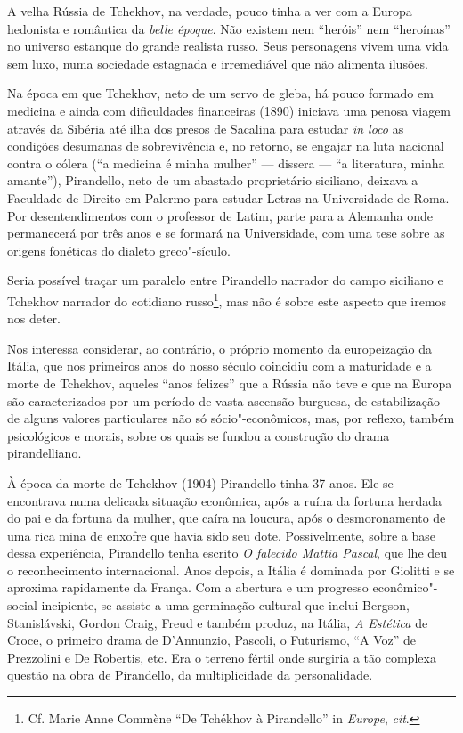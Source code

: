 A velha Rússia de Tchekhov, na verdade, pouco tinha a ver com a Europa
hedonista e romântica da \emph{belle époque}. Não existem nem ``heróis''
nem ``heroínas'' no universo estanque do grande realista russo. Seus
personagens vivem uma vida sem luxo, numa sociedade estagnada e
irremediável que não alimenta ilusões.

Na época em que Tchekhov, neto de um servo de gleba, há pouco formado em
medicina e ainda com dificuldades financeiras (1890) iniciava uma penosa
viagem através da Sibéria até ilha dos presos de Sacalina para estudar
\emph{in loco} as condições desumanas de sobrevivência e, no retorno, se
engajar na luta nacional contra o cólera (``a medicina é minha mulher'' ---
dissera --- ``a literatura, minha amante''), Pirandello, neto de um abastado
proprietário siciliano, deixava a Faculdade de Direito em Palermo para
estudar Letras na Universidade de Roma. Por desentendimentos com o
professor de Latim, parte para a Alemanha onde permanecerá por três anos
e se formará na Universidade, com uma tese sobre as origens fonéticas do
dialeto greco"-sículo.

Seria possível traçar um paralelo entre Pirandello narrador do campo
siciliano e Tchekhov narrador do cotidiano russo\footnote{Cf. Marie Anne
  Commène ``De Tchékhov à Pirandello'' in \emph{Europe}, \emph{cit}.}, mas não é sobre
este aspecto que iremos nos deter.

Nos interessa considerar, ao contrário, o próprio momento da
europeização da Itália, que nos primeiros anos do nosso século coincidiu
com a maturidade e a morte de Tchekhov, aqueles ``anos felizes'' que a
Rússia não teve e que na Europa são caracterizados por um período de
vasta ascensão burguesa, de estabilização de alguns valores particulares
não só sócio"-econômicos, mas, por reflexo, também psicológicos e morais,
sobre os quais se fundou a construção do drama pirandelliano.

À época da morte de Tchekhov (1904) Pirandello tinha 37 anos. Ele se
encontrava numa delicada situação econômica, após a ruína da fortuna
herdada do pai e da fortuna da mulher, que caíra na loucura, após o
desmoronamento de uma rica mina de enxofre que havia sido seu dote.
Possivelmente, sobre a base dessa experiência, Pirandello tenha escrito
\emph{O falecido Mattia Pascal}, que lhe deu o reconhecimento
internacional. Anos depois, a Itália é dominada por Giolitti e se
aproxima rapidamente da França. Com a abertura e um progresso
econômico"-social incipiente, se assiste a uma germinação cultural que
inclui Bergson, Stanislávski, Gordon Craig, Freud e também produz, na
Itália, \emph{A Estética} de Croce, o primeiro drama de D'Annunzio,
Pascoli, o Futurismo, ``A Voz'' de Prezzolini e De Robertis, etc. Era o
terreno fértil onde surgiria a tão complexa questão na obra de
Pirandello, da multiplicidade da personalidade.

